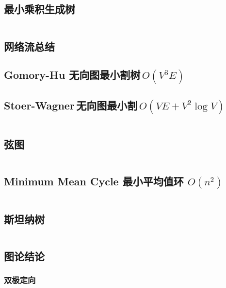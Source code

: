 				\subsection{最小乘积生成树}
					\inputminted{cpp}{sections/GraphTheory/assets/graph/最小乘积生成树.cpp}
				\subsection{网络流总结}
					
				\subsection{Gomory-Hu 无向图最小割树\,$O(V ^ 3 E)$}
					
				\subsection{Stoer-Wagner\,无向图最小割\,$O(VE + V ^ 2 \log V)$}
					\inputminted{cpp}{sections/GraphTheory/assets/graph/Stoer-Wagner.cpp}
				\subsection{弦图}
					
					\inputminted{cpp}{sections/GraphTheory/assets/graph/弦图.cpp}
				\subsection{Minimum Mean Cycle 最小平均值环 $O(n^2)$}
					\inputminted{cpp}{sections/GraphTheory/assets/graph/MeanCycle.cpp}
				\subsection{斯坦纳树}
					\inputminted{cpp}{sections/GraphTheory/assets/graph/斯坦纳树.cpp}
				\subsection{图论结论}
					
					
					
					
					
					
					\subsubsection{双极定向}
					\inputminted{cpp}{sections/GraphTheory/assets/graph/bipolar_orientation.cpp}
					
					
